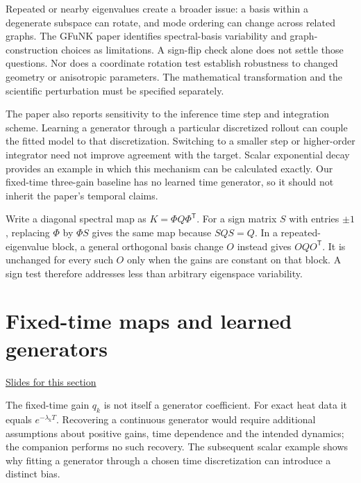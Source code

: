 \documentclass[11pt,letterpaper]{article}
\theoremstyle{definition}\newtheorem{definition}{Definition}\newtheorem{example}{Example}
\numberwithin{equation}{section}
\begin{document}
Repeated or nearby eigenvalues create a broader issue: a basis within a degenerate subspace can rotate, and mode ordering can change across related graphs. The GFuNK paper identifies spectral-basis variability and graph-construction choices as limitations. A sign-flip check alone does not settle those questions. Nor does a coordinate rotation test establish robustness to changed geometry or anisotropic parameters. The mathematical transformation and the scientific perturbation must be specified separately.

The paper also reports sensitivity to the inference time step and integration scheme. Learning a generator through a particular discretized rollout can couple the fitted model to that discretization. Switching to a smaller step or higher-order integrator need not improve agreement with the target. Scalar exponential decay provides an example in which this mechanism can be calculated exactly. Our fixed-time three-gain baseline has no learned time generator, so it should not inherit the paper's temporal claims.

Write a diagonal spectral map as $K=\Phi Q\Phi^{\mathsf T}$. For a sign matrix $S$ with entries $\pm1$, replacing $\Phi$ by $\Phi S$ gives the same map because $SQS=Q$. In a repeated-eigenvalue block, a general orthogonal basis change $O$ instead gives $OQO^{\mathsf T}$. It is unchanged for every such $O$ only when the gains are constant on that block. A sign test therefore addresses less than arbitrary eigenspace variability.
\section{Fixed-time maps and learned generators}
\hypertarget{note-fixed-time-maps-and-learned-generators}{}\label{note:fixed-time-maps-and-learned-generators}
{\small \href{slides.html\#frame=the-research-scope-remains-broader\&step=1}{Slides for this section}}\par


The fixed-time gain $q_k$ is not itself a generator coefficient. For exact heat data it equals $e^{-\lambda_kT}$. Recovering a continuous generator would require additional assumptions about positive gains, time dependence and the intended dynamics; the companion performs no such recovery. The subsequent scalar example shows why fitting a generator through a chosen time discretization can introduce a distinct bias.
\bigskip
\end{document}
